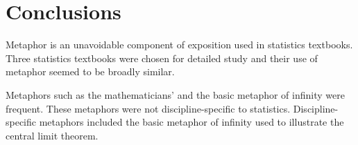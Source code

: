 \section{Conclusions}

Metaphor is an unavoidable component of exposition used in statistics
textbooks.  Three statistics textbooks were chosen for detailed study
and their use of metaphor seemed to be broadly similar.

Metaphors such as the mathematicians'  and the basic
metaphor of infinity were frequent.  These metaphors were not
discipline-specific to statistics.  Discipline-specific metaphors
included the basic metaphor of infinity used to illustrate the central
limit theorem.
